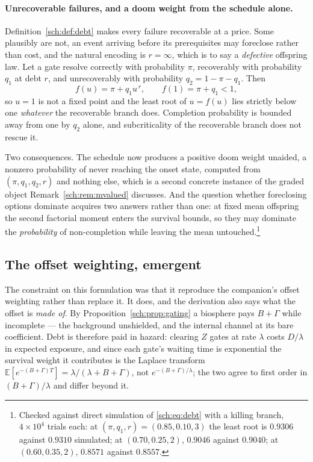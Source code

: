 \documentclass[11pt]{article}
\newcommand{\E}{\mathbb{E}}
\theoremstyle{plain}
\theoremstyle{definition}
\theoremstyle{remark}
\begin{document}
\paragraph{Unrecoverable failures, and a doom weight from the
schedule alone.}\label{sch:rem:defective}
Definition~\ref{sch:def:debt} makes every failure recoverable at a
price. Some plausibly are not, an event arriving before its
prerequisites may foreclose rather than cost, and the natural
encoding is $r=\infty$, which is to say a \emph{defective} offspring
law. Let a gate resolve correctly with probability $\pi$, recoverably
with probability $q_1$ at debt $r$, and unrecoverably with probability
$q_2=1-\pi-q_1$. Then
\begin{equation}\label{sch:eq:defective}
f(u)=\pi+q_1u^{\,r},\qquad f(1)=\pi+q_1<1,
\end{equation}
so $u=1$ is not a fixed point and the least root of $u=f(u)$ lies
strictly below one \emph{whatever} the recoverable branch does.
Completion probability is bounded away from one by $q_2$ alone, and
subcriticality of the recoverable branch does not rescue it.

Two consequences. The schedule now produces a positive doom weight
unaided, a nonzero probability of never reaching the onset state,
computed from $(\pi,q_1,q_2,r)$ and nothing else, which is a second
concrete instance of the graded object
Remark~\ref{sch:rem:mvalued} discusses. And the question whether
foreclosing options dominate acquires two answers rather than one: at
fixed mean offspring the second factorial moment enters the survival
bounds, so they may dominate the \emph{probability} of non-completion
while leaving the mean untouched.\footnote{Checked
against direct simulation of \eqref{sch:eq:debt} with a killing branch,
$4\times10^{4}$ trials each: at $(\pi,q_1,r)=(0.85,0.10,3)$ the least
root is $0.9306$ against $0.9310$ simulated; at $(0.70,0.25,2)$,
$0.9046$ against $0.9040$; at $(0.60,0.35,2)$, $0.8571$ against
$0.8557$.}

\subsection{The offset weighting, emergent}\label{sch:subsub:emergent}

The constraint on this formulation was that it reproduce the companion's
offset weighting rather than replace it. It does, and the derivation
also says what the offset is \emph{made of}. By Proposition~\ref{sch:prop:gating} a biosphere pays $B+\Gamma$ while
incomplete --- the background unshielded, and the internal channel at its
bare coefficient. Debt is therefore paid in hazard: clearing $Z$ gates at
rate $\lambda$ costs $D/\lambda$ in expected exposure, and since each
gate's waiting time is exponential the survival weight it contributes
is the Laplace transform $\E[e^{-(B+\Gamma)T}]=\lambda/(\lambda+B+\Gamma)$,
not $e^{-(B+\Gamma)/\lambda}$; the two agree to first order in
$(B+\Gamma)/\lambda$ and differ beyond it.
\end{document}
